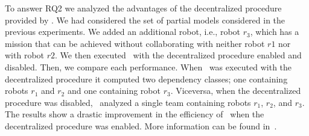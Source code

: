 To answer RQ2 we analyzed the advantages of the decentralized procedure provided by \toolName.
We had considered the set of partial models considered in the previous experiments. 
We added an additional robot, i.e., robot $r_3$, which has a mission that can be achieved without collaborating with neither  robot $r1$ nor with robot $r2$. 
We then executed \toolName\ with the decentralized procedure enabled and disabled. 
Then, we compare each performance. 
When \toolName\ was executed with the  decentralized procedure it computed two dependency classes; one containing robots $r_1$ and $r_2$ and one containing robot $r_3$. 
Viceversa, when the decentralized procedure was disabled, \toolName\ 
analyzed a single team containing  robots $r_1$, $r_2$, and $r_3$. 
The results show a drastic improvement in the efficiency of \toolName\ when the decentralized procedure was enabled.
More information can be found in~\cite{mapmaker17}.


